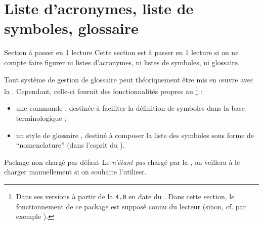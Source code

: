 \section{Liste d'acronymes, liste de symboles,
  glossaire}\label{sec:sigl-gloss-nomencl}

\begin{dbremark*}{Section à passer en 1\iere{} lecture}
  Cette section est à passer en 1\iere{} lecture si on ne compte faire figurer
  ni listes d'acronymes, ni listes de symboles, ni glossaire.
\end{dbremark*}

Tout système de gestion de glossaire peut théoriquement être mis en œuvre avec
la \yatcl. Cependant, celle-ci fournit des fonctionnalités propres au
\footnote{Dans ses versions à partir de la \texttt{4.0} en
  date du . Dans cette section, le fonctionnement de
  ce package est supposé connu du lecteur (sinon, cf. par exemple
  \cite{en-ligne7}).} :
\begin{itemize}
\item une commande , destinée à faciliter la définition de
  symboles dans la base terminologique ;
\item un style de glossaire , destiné à composer la
  liste des symboles sous forme de \enquote{nomenclature} (dans l'esprit du
  ).
\end{itemize}

\begin{dbwarning}{Package  non chargé par défaut}{}
  Le  \emph{n'étant pas} chargé par la \yatcl, on veillera
  à le charger manuellement si on souhaite l'utiliser.
\end{dbwarning}


